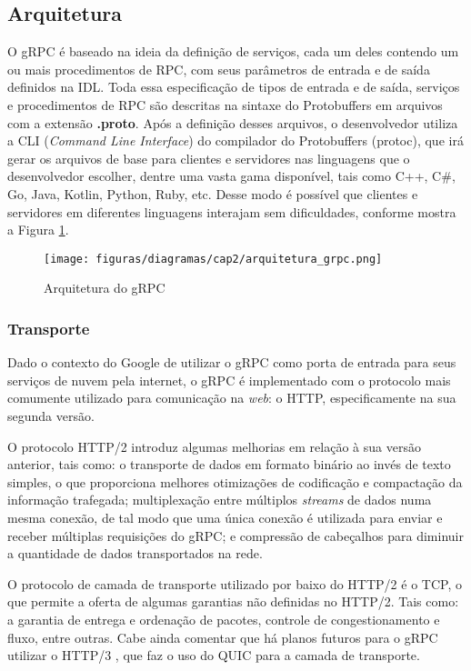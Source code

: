 \subsection{Arquitetura}

O gRPC \cite{google_grpc_2015} é baseado na ideia da definição de serviços, cada um deles contendo um ou mais procedimentos de RPC, com seus parâmetros de entrada e de saída definidos na IDL. Toda essa especificação de tipos de entrada e de saída, serviços e procedimentos de RPC são descritas na sintaxe do Protobuffers em arquivos com a extensão \textbf{.proto}. Após a definição desses arquivos, o desenvolvedor utiliza a CLI (\textit{Command Line Interface}) do compilador do Protobuffers (protoc), que irá gerar os arquivos de base para clientes e servidores nas linguagens que o desenvolvedor escolher, dentre uma vasta gama disponível, tais como C++, C\#, Go, Java, Kotlin, Python, Ruby, etc. Desse modo é possível que clientes e servidores em diferentes linguagens interajam sem dificuldades, conforme mostra a Figura \ref{fig:arquitetura_grpc}.

\begin{figure}[ht]
    \centering
    \caption{Arquitetura do gRPC}
    \texttt{[image: figuras/diagramas/cap2/arquitetura\_grpc.png]} 
    \label{fig:arquitetura_grpc}
\end{figure}

\subsubsection{Transporte}

Dado o contexto do Google de utilizar o gRPC como porta de entrada para seus serviços de nuvem pela internet, o gRPC é implementado com o protocolo mais comumente utilizado para comunicação na \textit{web}: o HTTP, especificamente na sua segunda versão.

O protocolo HTTP/2 \cite{rfc7540} introduz algumas melhorias em relação à sua versão anterior, tais como: o transporte de dados em formato binário ao invés de texto simples, o que proporciona melhores otimizações de codificação e compactação da informação trafegada; multiplexação entre múltiplos \textit{streams} de dados numa mesma conexão, de tal modo que uma única conexão é utilizada para enviar e receber múltiplas requisições do gRPC; e compressão de cabeçalhos para diminuir a quantidade de dados transportados na rede.

O protocolo de camada de transporte utilizado por baixo do HTTP/2 é o TCP, o que permite a oferta de algumas garantias não definidas no HTTP/2. Tais como: a garantia de entrega e ordenação de pacotes, controle de congestionamento e fluxo, entre outras. Cabe ainda comentar que há planos futuros para o gRPC utilizar o HTTP/3 \cite{ietf-quic-http-34}, que faz o uso do QUIC para a camada de transporte.

